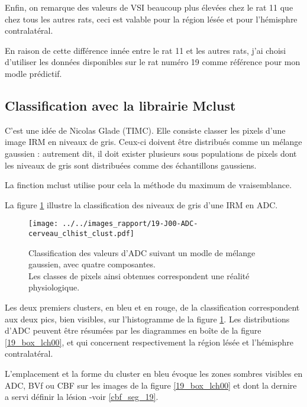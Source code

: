 \etoile
Enfin, on remarque des valeurs de VSI beaucoup plus \'elev\'ees chez le rat 11 que chez tous les autres rats, %
ceci est valable pour la r\'egion l\'es\'ee et pour l'h\'emisphre contralat\'eral.

\par
En raison de cette diff\'erence inn\'ee entre le rat 11 et les autres rats, %
j'ai choisi d'utiliser les donn\'ees disponibles sur le rat num\'ero 19 comme r\'ef\'erence pour mon modle pr\'edictif.

\FloatBarrier
\subsection{Classification avec la librairie Mclust}%

C'est une id\'ee de Nicolas Glade (TIMC). Elle consiste  classer les pixels d'une image IRM en niveaux de gris. %
Ceux-ci doivent \^etre distribu\'es comme un m\'elange gaussien : %
autrement dit, il doit exister plusieurs sous populations de pixels dont les niveaux de gris sont distribu\'ees comme des \'echantillons gaussiens.

\par
La finction mclust utilise pour cela la m\'ethode du maximum de vraisemblance.
\par
La figure \ref{exem_ADC_19} illustre la classification des niveaux de gris d'une IRM en ADC.

\begin{figure}[H]
\texttt{[image: ../../images\_rapport/19-J00-ADC-cerveau\_clhist\_clust.pdf]}
\caption{Classification des valeurs d'ADC suivant un modle de m\'elange gaussien, avec quatre composantes.
\\
Les classes de pixels ainsi obtenues correspondent  une r\'ealit\'e physiologique.
}
\label{exem_ADC_19}
\end{figure}

\par
Les deux premiers clusters, en bleu et en rouge, de la classification correspondent aux deux pics, bien visibles, sur l'histogramme de la figure \ref{exem_ADC_19}. %
Les distributions d'ADC peuvent \^etre r\'esum\'ees par les diagrammes en bo\^ite de la figure \ref{19_box_lch00}, %
et qui concernent respectivement la r\'egion l\'es\'ee et l'h\'emisphre contralat\'eral.

\par
L'emplacement et la forme du cluster en bleu \'evoque les zones sombres visibles en ADC, BVf ou CBF sur les images de la figure \ref{19_box_lch00} %
et dont la dernire a servi  d\'efinir la l\'esion -voir \ref{cbf_seg_19}.

